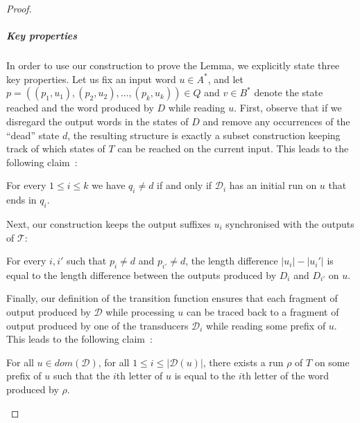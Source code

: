 \documentclass[a4paper,UKenglish,cleveref, autoref, thm-restate,authorcolumns, colorlinks]{lipics-v2021}
\newcommand\dom{\mathit{dom}}
\newcommand\calD{\mathcal{D}}
\newcommand{\trans}{\mathcal{T}}
\begin{document}
{\begin{proof}
    \subparagraph*{Key properties}
    In order to use our construction to prove the Lemma,
    we explicitly state three key properties.
    Let us fix an input word $u \in A^*$,
    and let $p = ((p_1,u_1), (p_2,u_2), \ldots, (p_k,u_k)) \in Q$ and $v \in B^*$
    denote the state reached and the word produced by $D$ while reading $u$.
    First, observe that if we disregard the output words in the states of $D$
    and remove any occurrences of the ``dead'' state $d$,
    the resulting structure is exactly a subset construction keeping track of which
    states of $T$ can be reached on the current input.
    This leads to the following claim~:
    
    \begin{claim}\label{claim:states}
        For every $1 \leq i \leq k$ we have $q_i \neq d$
        if and only if $\calD_i$ has an initial run on $u$ that ends in $q_i$.
    \end{claim}
    Next, our construction keeps the output suffixes $u_i$
    synchronised with the outputs of $\trans$:

    \begin{claim}\label{claim:words}
        For every $i,i'$ such that $p_i \neq d$ and $p_{i'} \neq d$,
        the length difference $|u_i| - |u_i'|$ is equal
        to the length difference between the outputs produced by $D_i$ and $D_{i'}$ on $u$.
    \end{claim}
    Finally, our definition of the transition function ensures that each fragment of output
    produced by $\calD$ while processing $u$ can be traced back to a fragment of output
    produced by one of the transducers $\calD_i$ while reading some prefix of $u$.
    This leads to the following claim~:
 
    \begin{claim}\label{claim:output}
        For all $u \in \dom(\calD)$, for all $1 \leq i \leq |\calD(u)|$,
        there exists a run $\rho$ of $T$ on some prefix of $u$
        such that the $i$th letter of $u$ is equal to the $i$th letter of the word produced by $\rho$.
    \end{claim}


\end{proof}}
\end{document}
